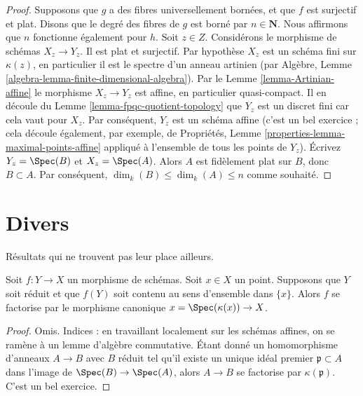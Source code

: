 \begin{proof}
Supposons que $g$ a des fibres universellement bornées, et que $f$
est surjectif et plat. Disons que le degré des fibres de $g$
est borné par $n \in \mathbf{N}$. Nous affirmons
que $n$ fonctionne également pour $h$. Soit
$z \in Z$. Considérons le morphisme de schémas $X_z \to Y_z$. Il est
plat et surjectif. Par hypothèse $X_z$ est un schéma
fini sur $\kappa(z)$,
en particulier il est le spectre d'un anneau artinien (par
Algèbre, Lemme \ref{algebra-lemma-finite-dimensional-algebra}). Par le Lemme \ref{lemma-Artinian-affine} le morphisme $X_z \to Y_z$
est affine, en particulier quasi-compact. Il
en découle du Lemme \ref{lemma-fpqc-quotient-topology} que $Y_z$
est un discret fini car cela vaut pour $X_z$.
Par conséquent, $Y_z$ est un schéma affine (c'est un bel exercice ; cela
découle également,
par exemple, de Propriétés, Lemme \ref{properties-lemma-maximal-points-affine} appliqué à
l'ensemble de tous les points de $Y_z$).
Écrivez $Y_z = \Spec(B)$ et $X_z = \Spec(A)$. Alors $A$
est fidèlement plat sur $B$, donc $B \subset A$.
Par conséquent, $\dim_k(B) \leq \dim_k(A) \leq n$ comme souhaité.
\end{proof}





\section{Divers}
\label{section-misc}

\noindent
Résultats qui ne trouvent pas leur place ailleurs.

\begin{lemma}
\label{lemma-factor-through-point}
Soit $f : Y \to X$ un morphisme de schémas. Soit $x \in X$ un point. Supposons
que $Y$ soit réduit et que $f(Y)$ soit contenu au sens d'ensemble
dans $\{x\}$. Alors $f$ se factorise par le morphisme
canonique $x = \Spec(\kappa(x)) \to X$.
\end{lemma}

\begin{proof}
Omis. Indices : en travaillant localement sur les schémas affines, on se ramène à
un lemme d'algèbre commutative. Étant donné un homomorphisme d'anneaux $A \to B$
avec $B$ réduit tel qu'il existe un unique idéal premier
$\mathfrak p \subset A$ dans l'image de $\Spec(B) \to \Spec(A)$, alors $A \to B$ se factorise par $\kappa(\mathfrak p)$.
C'est un bel exercice.
\end{proof}

